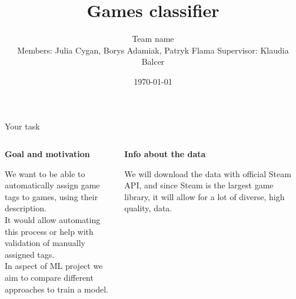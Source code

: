 \documentclass{beamer}
\title{Games classifier}
\author[Team name]{Team name\\[5mm]
{\small Members: Julia Cygan, Borys Adamiak, Patryk Flama}
\hspace{18mm} 
{\small Supervisor: Klaudia Balcer}}
\institute{UWr}
\date{\today}
\begin{document}
\begin{frame}
\titlepage
\end{frame}


\begin{frame}[t]{Your task}

\begin{columns}
\begin{column}[t]{0.5\textwidth}

{\bf Goal and motivation}

We want to be able to automatically assign game tags to games, using their description. \\
It would allow automating this process or help with validation of manually assigned tags. \\
In aspect of ML project we aim to compare different approaches to train a model.

\end{column}
\begin{column}[t]{0.5\textwidth}

{\bf Info about the data}

We will download the data with official Steam API, and since Steam is the largest game library, it will allow for a lot of diverse, high quality, data.

\end{column}
\end{columns}

\end{frame}
\end{document}
